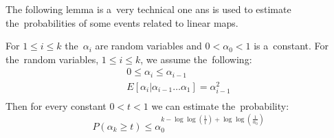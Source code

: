 The following lemma is a~very technical one ans is used to estimate the~probabilities of some events related to linear maps.
\begin{lemma}
\label{lemma-random-variable}
For $1 \leq i \leq k$ the~$\alpha_i$ are random variables and $0 < \alpha_0 < 1$ is a~constant. For the~random variables, $1 \leq i \leq k$, we assume the~following:
\begin{gather*}
0 \leq \alpha_i \leq \alpha_{i - 1} \\
E[ \alpha_i | \alpha_{i-1} \dots \alpha_1 ] = \alpha_{i-1}^{2} \\
\end{gather*}
Then for every constant $0 < t < 1$ we can estimate the~probability:
\begin{displaymath}
P(\alpha_k \geq t) \leq \alpha_0^{k - \log \log (\frac{1}{t}) + \log \log \left(\frac{1}{\alpha_0}\right)}
\end{displaymath}
\end{lemma}
